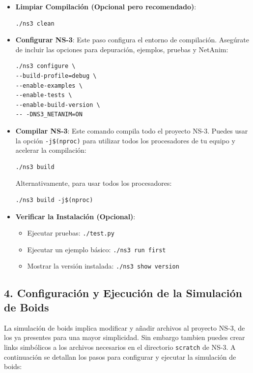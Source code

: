 \documentclass{article}
\begin{document}
\begin{itemize}
    \item \textbf{Limpiar Compilación (Opcional pero recomendado)}:
    \begin{lstlisting}
./ns3 clean
    \end{lstlisting}
    \item \textbf{Configurar NS-3}: Este paso configura el entorno de compilación. Asegúrate de incluir las opciones para depuración, ejemplos, pruebas y NetAnim:
    \begin{lstlisting}
./ns3 configure \
--build-profile=debug \
--enable-examples \
--enable-tests \
--enable-build-version \
-- -DNS3_NETANIM=ON
    \end{lstlisting}
    \item \textbf{Compilar NS-3}: Este comando compila todo el proyecto NS-3. Puedes usar la opción \texttt{-j\$(nproc)} para utilizar todos los procesadores de tu equipo y acelerar la compilación:
    \begin{lstlisting}
./ns3 build
    \end{lstlisting}
    Alternativamente, para usar todos los procesadores:
    \begin{lstlisting}
./ns3 build -j$(nproc)
    \end{lstlisting}
    \item \textbf{Verificar la Instalación (Opcional)}:
    \begin{itemize}
        \item Ejecutar pruebas: \texttt{./test.py}
        \item Ejecutar un ejemplo básico: \texttt{./ns3 run first}
        \item Mostrar la versión instalada: \texttt{./ns3 show version}
    \end{itemize}
\end{itemize}

\subsection*{\textbf{4. Configuración y Ejecución de la Simulación de Boids}}

La simulación de boids implica modificar y añadir archivos al proyecto NS-3, de los ya presentes para una mayor simplicidad. Sin embargo tambien puedes crear links simbólicos a los archivos necesarios en el directorio \texttt{scratch} de NS-3. A continuación se detallan los pasos para configurar y ejecutar la simulación de boids:
\end{document}

